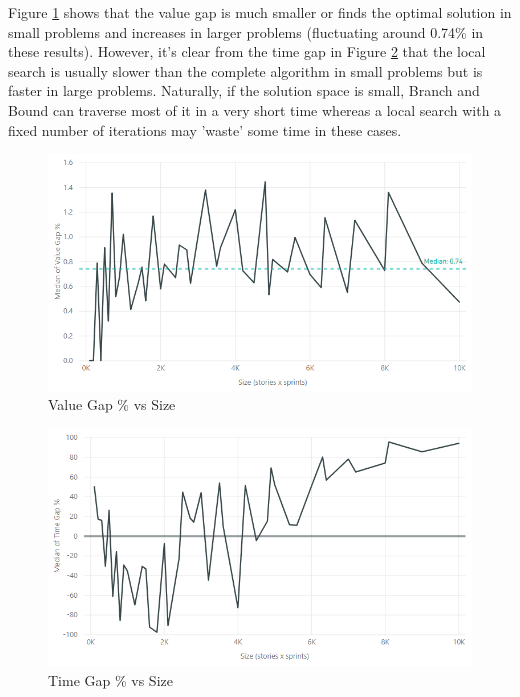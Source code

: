 Figure \ref{fig:value_gap_vs_size} shows that the value gap is much smaller or finds the optimal solution in small problems and increases in larger problems (fluctuating around 0.74\% in these results). However, it's clear from the time gap in Figure \ref{fig:time_gap_vs_size} that the local search is usually slower than the complete algorithm in small problems but is faster in large problems. Naturally, if the solution space is small, Branch and Bound can traverse most of it in a very short time whereas a local search with a fixed number of iterations may 'waste' some time in these cases.

\begin{figure}[h!]
    \centering
    \includegraphics[width=\textwidth]{Figures/Results/annealing_value_gap_size.png}
    \caption{Value Gap \% vs Size}
    \label{fig:value_gap_vs_size}
\end{figure}

\begin{figure}[h!]
    \centering
    \includegraphics[width=\textwidth]{Figures/Results/annealing_time_gap_size.png}
    \caption{Time Gap \% vs Size}
    \label{fig:time_gap_vs_size}
\end{figure}

